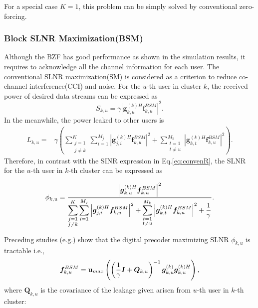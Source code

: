 \documentclass[conference]{IEEEtran}
\begin{document}
{For a special case $K=1$, this problem can be simply solved by conventional zero-forcing.


\subsubsection{Block SLNR Maximization(BSM)}
Although the BZF has good performance as shown in the simulation results, it requires to acknowledge all the channel information for each user.
The conventional SLNR maximization(SM) is considered as a criterion to reduce co-channel interference(CCI) and noise.  For the $u$-th user in cluster $k$, the received power of desired data streams can be expressed as
\begin{equation}
S_{k,u} = \gamma\left|\bm{g}_{k,u}^{(k)H}  \bm{f}^{BSM}_{k,u}\right|^2.
\end{equation}
In the meanwhile, the power leaked to other users is
\begin{align}
L_{k,u} = &\gamma\left(\sum_{\substack{j=1\\j\neq k}}^{K}\sum_{i=1}^{M_j}\left|\bm{g}_{j,i}^{(k)H} \bm{f}^{BSM}_{k,u}\right|^2+ \sum_{\substack{t=1\\t\neq u}}^{M_k}\left|\bm{g}_{k,t}^{(k)H} \bm{f}^{BSM}_{k,u}\right|^2\right).
\end{align}
Therefore, in contrast with the SINR expression in Eq.\eqref{eq:convenR}, the SLNR for the $u$-th user in $k$-th cluster can be expressed as


\begin{equation}\label{eq:slnr}
\phi_{k,u} = \frac{\left|\bm{g}_{k,u}^{(k)H}  \bm{f}^{BSM}_{k,u}\right|^2}{\displaystyle\sum_{\substack{j=1\\j\neq k}}^{K}\displaystyle\sum_{i=1}^{M_j}\left|\bm{g}_{j,i}^{(k)H} \bm{f}^{BSM}_{k,u}\right|^2+ \displaystyle\sum_{\substack{t=1\\t\neq u}}^{M_k}\left|\bm{g}_{k,t}^{(k)H} \bm{f}^{BSM}_{k,u}\right|^2+{1\over \gamma}}.
\end{equation}

Preceding studies (e.g.\cite{wang2012statistical}) show that the digital precoder maximizing SLNR $\phi_{k,u}$ is tractable i.e.,
\begin{equation}\small
\bm{f}^{BSM}_{k,u} = 
\mathbf{u}_{max}\left( \left(\frac{1}{\gamma}\bm{I}+\bm{Q}_{k,u} \right)^{-1}{\bm{g}}_{k,u}^{(k)}{\bm{g}}_{k,u}^{(k)H}\right),
\end{equation}
where $\bm{Q}_{k,u}$ is the covariance of the leakage given arisen from $u$-th user in $k$-th cluster:

}
\end{document}
